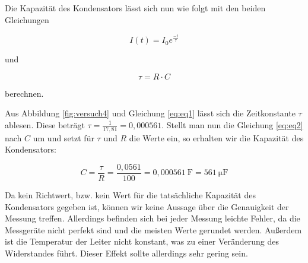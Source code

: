         Die Kapazität des Kondensators lässt sich nun wie folgt mit den beiden Gleichungen

        \begin{equation}
            I(t) = I_{0} e^{\frac{-t}{\tau}}
            \label{eq:eq1}
        \end{equation}

        und

        \begin{equation}
            \tau = R \cdot C
            \label{eq:eq2}
        \end{equation}

        berechnen.

        Aus Abbildung \ref{fig:versuch4} und Gleichung \ref{eq:eq1} lässt sich die Zeitkonstante $\tau$ ablesen. Diese beträgt $\tau = \frac{1}{17,81} = 0,000561$. Stellt man nun die Gleichung \ref{eq:eq2} nach $C$ um und setzt für $\tau$ und $R$ die Werte ein, so erhalten wir die Kapazität des Kondensators:

        \begin{equation}
            C = \frac{\tau}{R} = \frac{0,0561}{100} = 0,000561\ \mathrm{F} = 561\ \mathrm{\mu F}
        \end{equation}

        Da kein Richtwert, bzw. kein Wert für die tatsächliche Kapazität des Kondensators gegeben ist, können wir keine Aussage über die Genauigkeit der Messung treffen. Allerdings befinden sich bei jeder Messung leichte Fehler, da die Messgeräte nicht perfekt sind und die meisten Werte gerundet werden. Außerdem ist die Temperatur der Leiter nicht konstant, was zu einer Veränderung des Widerstandes führt. Dieser Effekt sollte allerdings sehr gering sein.